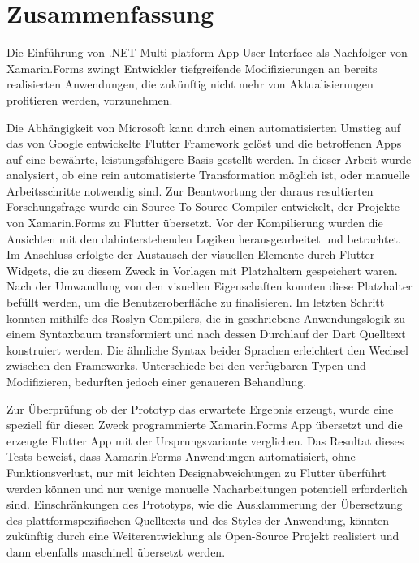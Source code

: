
\chapter*{Zusammenfassung}
Die Einführung von .NET Multi-platform App User Interface als Nachfolger von Xamarin.Forms zwingt Entwickler tiefgreifende Modifizierungen an bereits realisierten Anwendungen, die zukünftig nicht mehr von Aktualisierungen profitieren werden, vorzunehmen.

Die Abhängigkeit von Microsoft kann durch einen automatisierten Umstieg auf das von Google entwickelte Flutter Framework gelöst und die betroffenen Apps auf eine bewährte, leistungsfähigere Basis gestellt werden. In dieser Arbeit wurde analysiert, ob eine rein automatisierte Transformation möglich ist, oder manuelle Arbeitsschritte notwendig sind.  Zur Beantwortung der daraus resultierten Forschungsfrage wurde ein Source-To-Source Compiler entwickelt, der Projekte von Xamarin.Forms zu Flutter übersetzt. Vor der  Kompilierung wurden die Ansichten mit den dahinterstehenden Logiken herausgearbeitet und betrachtet.  Im Anschluss erfolgte der Austausch der visuellen Elemente durch Flutter Widgets, die zu diesem Zweck in Vorlagen mit Platzhaltern gespeichert waren. Nach der Umwandlung von den visuellen Eigenschaften konnten diese Platzhalter befüllt werden, um die Benutzeroberfläche zu finalisieren.  Im letzten Schritt konnten mithilfe des Roslyn Compilers, die in \Csharp{} geschriebene Anwendungslogik zu einem Syntaxbaum transformiert und nach dessen Durchlauf der Dart Quelltext konstruiert werden. Die ähnliche Syntax beider Sprachen erleichtert den Wechsel zwischen den Frameworks.  Unterschiede bei den verfügbaren Typen und Modifizieren, bedurften jedoch einer genaueren Behandlung.

Zur Überprüfung ob der Prototyp das erwartete Ergebnis erzeugt, wurde eine speziell für diesen Zweck programmierte Xamarin.Forms App übersetzt und die erzeugte Flutter App mit der Ursprungsvariante verglichen. Das Resultat dieses Tests beweist, dass Xamarin.Forms Anwendungen automatisiert, ohne Funktionsverlust, nur mit leichten Designabweichungen zu Flutter überführt werden können und nur wenige manuelle Nacharbeitungen potentiell erforderlich sind.  Einschränkungen des Prototyps, wie die Ausklammerung der Übersetzung des plattformspezifischen Quelltexts und des Styles der Anwendung, könnten zukünftig durch eine Weiterentwicklung als Open-Source Projekt realisiert und dann ebenfalls maschinell übersetzt werden.



